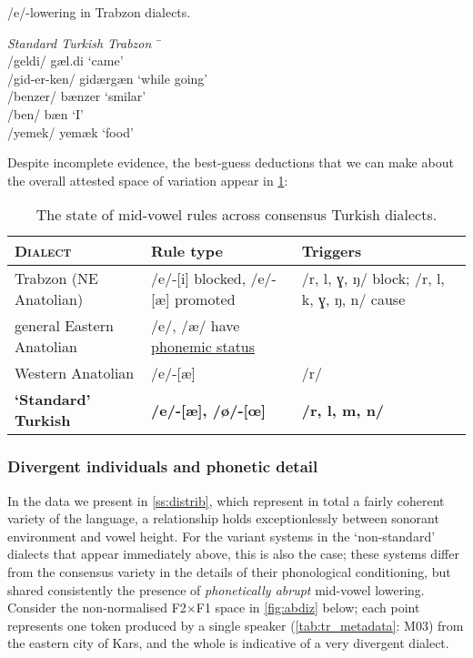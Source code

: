 \begin{example}\label{ex:trabzon2} /e/-lowering in Trabzon dialects.
\begin{tabbing}
  \textit{Standard Turkish} \tab[2cm] \= \textit{Trabzon} \tab[2cm] \= \ \\
  /geldi/ \> gæl.di \> `came'\\
  /gid-er-ken/ \> gidærgæn \> `while going' \\
  /benzer/ \> bænzer \> `smilar' \\
  /ben/ \> bæn \> `I'\\
  /yemek/ \> yemæk  \> `food'
\end{tabbing}
\end{example}


Despite incomplete evidence, the best-guess deductions that we can make about the overall attested space of variation appear in \cref{tab:tr_dialects}:

\begin{table}[H]
\centering
  \begin{adjustbox}{width=\linewidth}
\begin{tabular}{lll}
  \toprule
\textsc{Dialect} & Rule type & Triggers \\
\midrule
Trabzon (NE Anatolian) & /e/-[i] blocked, /e/-[æ] promoted & /r, l, ɣ, ŋ/ block; /r, l, k, ɣ, ŋ, n/ cause \\
general Eastern Anatolian & /e/, /æ/ have \underline{phonemic status} \\
Western Anatolian & /e/-[æ] & /r/  \\
\textbf{`Standard' Turkish} &\textbf{ /e/-[æ], /ø/-[œ]} & \textbf{/r, l, m, n/}\\
\bottomrule
\end{tabular}
\end{adjustbox}
\caption{The state of mid-vowel rules across consensus Turkish dialects.}
\label{tab:tr_dialects}
\end{table}

\subsubsection{Divergent individuals and phonetic detail}\label{sss:abdiz}

In the data we present in \cref{ss:distrib}, which represent in total a fairly coherent variety of the language, a relationship holds exceptionlessly between sonorant environment and vowel height. For the variant systems in the `non-standard' dialects that appear immediately above, this is also the case; these systems differ from the consensus variety in the details of their phonological conditioning, but shared consistently the presence of \emph{phonetically abrupt} mid-vowel lowering. Consider the non-normalised F2$\times$F1 space in \cref{fig:abdiz} below; each point represents one token produced by a single speaker (\cref{tab:tr_metadata}: M03) from the eastern city of Kars, and the whole is indicative of a very divergent dialect.

